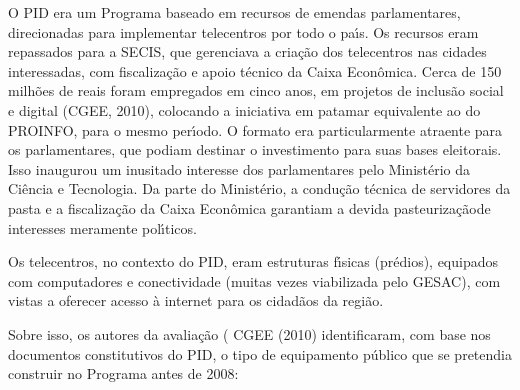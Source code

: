 \documentclass[
12pt,		%
openright,	%
twoside,  %
a4paper,			%
chapter=TITLE,		%
english,			%
french,				%
spanish,			%
brazil				%
]{USPSC-classe/USPSC}
\begin{document}
O PID era um Programa baseado em recursos de emendas parlamentares, direcionadas para implementar telecentros por todo o pa\'{\i}s. Os recursos eram repassados para a SECIS, que gerenciava a cria\c{c}\~ao dos telecentros nas cidades interessadas, com fiscaliza\c{c}\~ao e apoio t\'ecnico da Caixa Econ\^omica. Cerca de 150 milh\~oes de reais foram empregados em cinco anos, em projetos de inclus\~ao social e digital (CGEE, 2010), colocando a iniciativa em patamar equivalente ao do PROINFO, para o mesmo per\'{\i}odo. O formato era particularmente atraente para os parlamentares, que podiam destinar o investimento para suas bases eleitorais. Isso inaugurou um inusitado interesse dos parlamentares pelo Minist\'erio da Ci\^encia e Tecnologia. Da parte do Minist\'erio, a condu\c{c}\~ao t\'ecnica de servidores da pasta e a fiscaliza\c{c}\~ao da Caixa Econ\^omica garantiam a devida \textquotedbl pasteuriza\c{c}\~ao\textquotedbl  de interesses meramente pol\'{\i}ticos.









Os telecentros, no contexto do PID, eram estruturas f\'{\i}sicas (pr\'edios), equipados com computadores e conectividade (muitas vezes viabilizada pelo GESAC), com vistas a oferecer acesso \`a internet para os cidad\~aos da regi\~ao.









Sobre isso, os autores da avalia\c{c}\~ao ( CGEE (2010) identificaram, com base nos documentos constitutivos do PID, o tipo de equipamento p\'ublico que se pretendia construir no Programa antes de 2008:










\noindent\begin{center}\mbox{\centering{}}\end{center}
\end{document}
